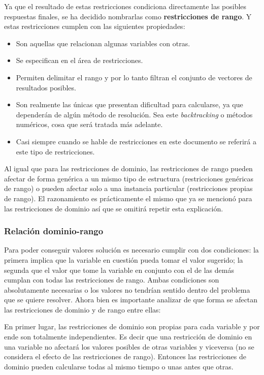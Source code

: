 Ya que el resultado de estas restricciones condiciona directamente las posibles
respuestas finales, se ha decidido nombrarlas como \textbf{restricciones de rango}. Y estas 
restricciones cumplen con las siguientes propiedades:

\begin{itemize}
 \item {Son aquellas que relacionan algunas variables con otras.}
 \item {Se especifican en el área de restricciones.}
 \item {Permiten delimitar el rango y por lo tanto filtran el conjunto de vectores 
  de resultados posibles.}
 \item {Son realmente las únicas que presentan 	dificultad para calcularse, ya que
  dependerán de algún método de	resolución. Sea este \emph{backtracking} o métodos 
  numéricos, cosa que será tratada más adelante.}
 \item {Casi siempre cuando se hable de restricciones en 	este documento se 
  referirá a este tipo de restricciones.}
\end{itemize}

Al igual que para las restricciones de dominio, las restricciones de rango pueden 
afectar de forma genérica a un mismo tipo de estructura (restricciones genéricas 
de rango) o pueden afectar solo a una instancia particular (restricciones propias 
de rango). El razonamiento es prácticamente el mismo que ya se mencionó para las
restricciones de dominio así que se omitirá repetir esta explicación.

\subsubsection{Relación dominio-rango}
Para poder conseguir valores solución es necesario cumplir con dos condiciones: 
la primera implica que la variable en cuestión pueda tomar el valor sugerido; 
la segunda que el valor que tome la variable en conjunto con el de las demás 
cumplan con todas las restricciones de rango. Ambas condiciones son absolutamente 
necesarias o los valores no tendrían sentido dentro del problema que se quiere 
resolver. Ahora bien es importante analizar de que forma se afectan las restricciones 
de dominio y de rango entre ellas:

En primer lugar, las restricciones de dominio son propias para cada variable y por 
ende son totalmente independientes. Es decir que una restricción de dominio en 
una variable no afectará los valores posibles de otras variables y viceversa (no 
se considera el efecto de las restricciones de rango). Entonces las restricciones 
de dominio pueden calcularse todas al mismo tiempo o unas antes que otras.

